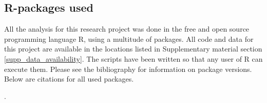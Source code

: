 \documentclass[12pt,letterpaper]{article}
\begin{document}
\FloatBarrier
\newpage
\subsection{R-packages used}
\label{appendix_r_packages}

All the analysis for this research project was done in the free and open source programming language R, using a multitude of packages. All code and data for this project are available in the locations listed in Supplementary material section \ref{supp_data_availability}. The scripts have been written so that any user of R can execute them. Please see the bibliography for information on package versions. Below are citations for all used packages.

.
\end{document}
